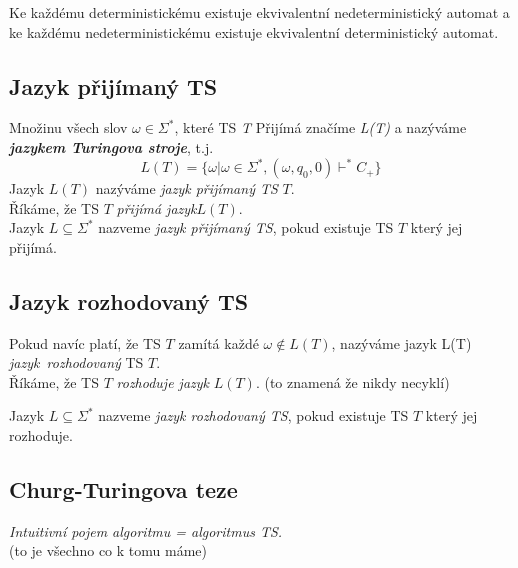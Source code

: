 \documentclass[10pt,a4paper]{article}
\theoremstyle{note}
\begin{document}
		Ke každému deterministickému existuje ekvivalentní nedeterministický automat a ke každému
		nedeterministickému existuje ekvivalentní deterministický automat.

	\subsection{Jazyk přijímaný TS}

		Množinu všech slov $\omega \in \Sigma^{*}$, které TS \textit{T} Přijímá značíme \textit{L(T)} a nazýváme 					\textit{\textbf{jazykem Turingova stroje}}, t.j.
		 $$L(T) = \{ \omega | \omega \in \Sigma^{*}, (\omega, q_{0},0) \vdash^{*} C_{+}\} $$
		Jazyk $L(T)$ nazýváme \textit{jazyk přijímaný TS} $T$.\\
		Říkáme, že TS $T$ \textit{přijímá jazyk}$ L(T)$.\\

		Jazyk $L \subseteq \Sigma^{*} $ nazveme\textit{ jazyk přijímaný TS}, pokud existuje TS $T$ který jej přijímá.

	\subsection{Jazyk rozhodovaný TS}

		Pokud navíc platí, že TS $T$ zamítá každé $\omega \notin L(T)$, nazýváme jazyk L(T)
		\textit{jazyk~rozhodovaný} TS $T$.\\
		Říkáme, že TS $T$ \textit{rozhoduje jazyk} $L(T)$. (to znamená že nikdy necyklí)

		Jazyk $L \subseteq \Sigma^{*} $ nazveme\textit{ jazyk rozhodovaný TS}, pokud existuje TS $T$ který jej rozhoduje.


	\subsection{Churg-Turingova teze}

		\textit{Intuitivní pojem algoritmu = algoritmus TS.} \\(to je všechno co k tomu máme)
\end{document}
